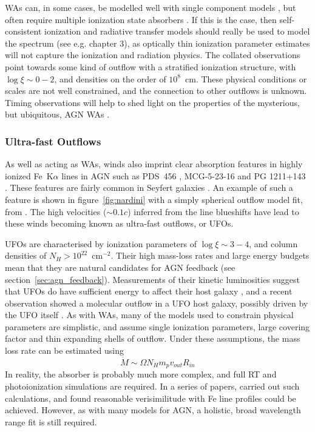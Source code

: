 WAs can, in some cases, be modelled well with single component 
models \citep{kaastra2000}, but often
require multiple ionization state absorbers 
\citep[e.g.][]{kriss1996,orr1997,krolikkriss2001,connolly2014}.
If this is the case, then self-consistent ionization and radiative transfer models
should really be used to model the spectrum (see e.g. chapter 3), 
as optically thin ionization parameter estimates will not capture 
the ionization and radiation physics.
The collated observations point towards some kind of outflow with a stratified ionization
structure, with $\log \xi \sim 0-2$, and densities on the order of $10^8$~cm. 
These physical conditions or scales are not well constrained, and the connection to 
other outflows is unknown. Timing observations will help to shed light on 
the properties of the mysterious, but ubiquitous, 
AGN WAs \citep{silva2015}.

\subsubsection{Ultra-fast Outflows}

As well as acting as WAs, winds also imprint clear absorption features
in highly ionized Fe~K$\alpha$ lines in AGN such as PDS~456 
\citep{reeves2003, gofford2014,matzeu2016},
MCG-5-23-16 \citep{braito2007} and PG 1211+143 \citep{poundsreeves2009,fukumura2015}.
These features are fairly common in Seyfert galaxies \citep{tombesi2010a, gofford2013}. 
An example of such a feature is shown in 
figure~\ref{fig:nardini} with a simply spherical outflow model fit, 
from \citep{nardini2015}. The high velocities ($\sim0.1c$) inferred 
from the line blueshifts have lead to these winds becoming known as 
ultra-fast outflows, or UFOs. 

UFOs are characterised by ionization parameters of $\log \xi \sim 3-4$,
and column densities of $N_H > 10^{22}$~cm$^{-2}$. Their high mass-loss rates
and large energy budgets mean that they are natural candidates for
AGN feedback (see section~\ref{sec:agn_feedback}). Measurements of
their kinetic luminosities suggest that UFOs do have sufficient 
energy to affect their host galaxy \citep{gofford2015}, and a recent observation
showed a molecular outflow in a UFO host galaxy, possibly driven 
by the UFO itself \citep{tombesi2015}. As with WAs, many of the models
used to constrain physical parameters are simplistic, and assume 
single ionization parameters, large covering factor
and thin expanding shells of outflow.
Under these assumptions, the mass loss rate can be estimated using
\begin{equation}
\label{eq:hse}
\dot{M} \sim \Omega N_H m_p v_{out} R_{in}
\end{equation}
In reality, the absorber is probably much more complex, and full 
RT and photoionization simulations are required. In a series of papers, 
\cite{simlong2008,sim2010,sim2010_hydro} carried out such calculations,
and found reasonable verisimilitude with Fe line profiles could be achieved.
However, as with many models for AGN, a holistic, broad wavelength range
fit is still required.

